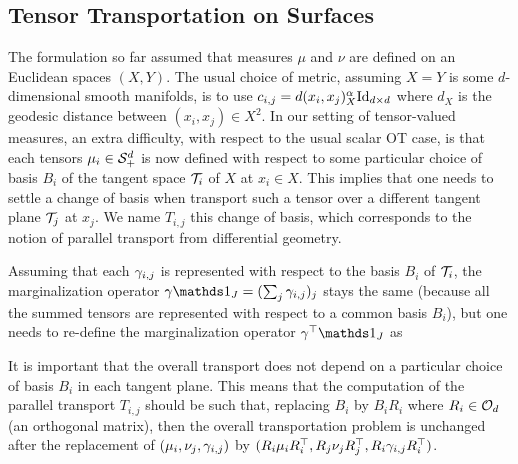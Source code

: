 \subsection{Tensor Transportation on Surfaces}



The formulation so far assumed that measures $\mu$ and $\nu$ are defined on an Euclidean spaces $(X,Y)$. The usual choice of metric, assuming $X=Y$ is some $d$-dimensional smooth manifolds, is to use $c_{i,j} = d(x_i,x_j)_X^\alpha \mathrm{Id}_{d \times d}$ where $d_X$ is the geodesic distance between $(x_i,x_j) \in X^2$. 
%
In our setting of tensor-valued measures, an extra difficulty, with respect to the usual scalar OT case, is that each tensors $\mu_i \in \mathcal{S}_+^d$ is now defined with respect to some particular choice of basis $B_i$ of the tangent space $\mathcal{T}_i$ of $X$ at $x_i \in X$. 
% 
This implies that one needs to settle a change of basis when transport such a tensor over a different tangent plane $\mathcal{T}_j$ at $x_j$. We name $T_{i,j}$ this change of basis, which corresponds to the notion of parallel transport from differential geometry.

Assuming that each $\gamma_{i,j}$ is represented with respect to the basis $B_i$ of $\mathcal{T}_i$, the marginalization operator $\ga \ones_J = (\sum_j \ga_{i,j})_j$ stays the same (because all the summed tensors are represented with respect to a common basis $B_i$), but one needs to re-define the marginalization operator $\ga^\top \ones_J$ as


\begin{rem}\label{rem-invariance}
	It is important that the overall transport does not depend on a particular choice of basis $B_i$ in each tangent plane. This means that the computation of the parallel transport $T_{i,j}$ should be such that, replacing $B_i$ by $B_i R_i$ where $R_i \in \mathcal{O}_d$ (an orthogonal matrix), then the overall transportation problem is unchanged after the replacement of $(\mu_i,\nu_j,\gamma_{i,j})$ by $(R_i \mu_i R_i^\top, R_j \nu_j R_j^\top, R_i\gamma_{i,j}R_i^\top)$.
\end{rem}

